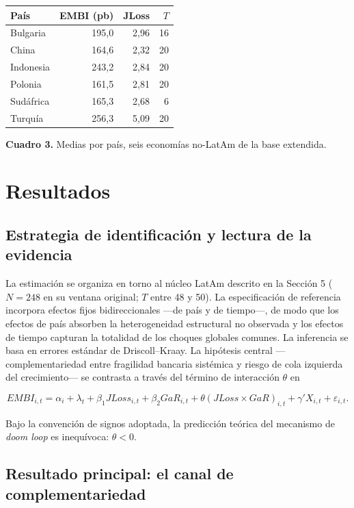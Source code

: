 \documentclass[5p,times,twocolumn,authoryear]{elsarticle}
\begin{document}
\begin{center}
\footnotesize
\begin{tabular}{lrrr}
\toprule
País & EMBI (pb) & JLoss & $T$ \\
\midrule
Bulgaria     & 195,0 & 2,96 & 16 \\
China        & 164,6 & 2,32 & 20 \\
Indonesia    & 243,2 & 2,84 & 20 \\
Polonia      & 161,5 & 2,81 & 20 \\
Sudáfrica    & 165,3 & 2,68 & 6  \\
Turquía      & 256,3 & 5,09 & 20 \\
\bottomrule
\end{tabular}

\medskip
\footnotesize\textbf{Cuadro 3.} Medias por país, seis economías no-LatAm de la base extendida.
\end{center}


\section{Resultados}

\subsection{Estrategia de identificación y lectura de la evidencia}

La estimación se organiza en torno al núcleo LatAm descrito en la Sección 5 ($N=248$ en su ventana original; $T$ entre 48 y 50). La especificación de referencia incorpora efectos fijos bidireccionales —de país y de tiempo—, de modo que los efectos de país absorben la heterogeneidad estructural no observada y los efectos de tiempo capturan la totalidad de los choques globales comunes. La inferencia se basa en errores estándar de Driscoll–Kraay. La hipótesis central —complementariedad entre fragilidad bancaria sistémica y riesgo de cola izquierda del crecimiento— se contrasta a través del término de interacción $\theta$ en

\[EMBI_{i,t}=\alpha_i+\lambda_t+\beta_1 JLoss_{i,t}+\beta_2 GaR_{i,t}+\theta (JLoss\times GaR)_{i,t}+\gamma' X_{i,t}+\varepsilon_{i,t}.\]

Bajo la convención de signos adoptada, la predicción teórica del mecanismo de \textit{doom loop} es inequívoca: $\theta<0$.

\subsection{Resultado principal: el canal de complementariedad}
\end{document}
